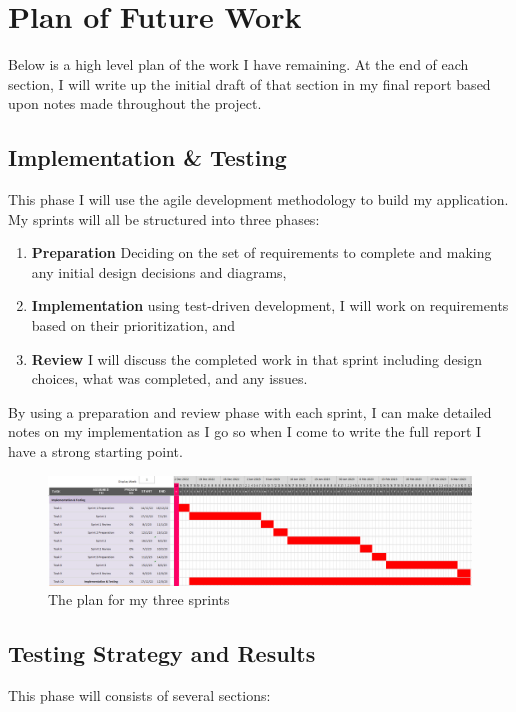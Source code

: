 \section{Plan of Future Work}

Below is a high level plan of the work I have remaining. At the end of each section, I will write up the initial draft of that section in my final report based upon notes made throughout the project.

\subsection*{Implementation \& Testing}
This phase I will use the agile development methodology to build my application. My sprints will all be structured into three phases:
\vspace{1mm}

\begin{enumerate}
  \item \textbf{Preparation} Deciding on the set of requirements to complete and making any initial design decisions and diagrams,
  \item \textbf{Implementation} using test-driven development, I will work on requirements based on their prioritization, and
  \item \textbf{Review} I will discuss the completed work in that sprint including design choices, what was completed, and any issues.  
\end{enumerate}

\vspace{1mm}\noindent By using a preparation and review phase with each sprint, I can make detailed notes on my implementation as I go so when I come to write the full report I have a strong starting point.

\begin{figure}[ht]
  \centering
  \includegraphics[width=\textwidth]{assets/images/charts/gantt/implementation-testing.png}
  \caption{The plan for my three sprints}
\end{figure}

\subsection*{Testing Strategy and Results}
This phase will consists of several sections:

